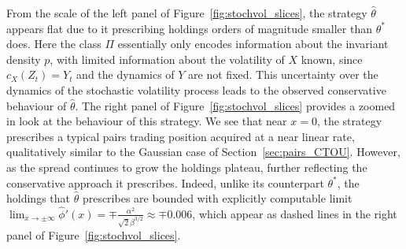 \documentclass{article}
\theoremstyle{plain}
\theoremstyle{definition}
\numberwithin{lem}{section}
\begin{document}
From the scale of the left panel of Figure~\ref{fig:stochvol_slices}, the strategy $\widehat \theta$ appears flat due to it prescribing holdings orders of magnitude smaller than $\theta^*$ does. Here the class $\Pi$ essentially only encodes information about the invariant density $p$, with limited information about the volatility of $X$ known, since $c_X(Z_t) = Y_t$ and the dynamics of $Y$ are not fixed. This uncertainty over the dynamics of the stochastic volatility process leads to the observed conservative behaviour of $\widehat \theta$. The right panel of Figure~\ref{fig:stochvol_slices} provides a zoomed in look at the behaviour of this strategy. We see that near $x = 0$, the strategy prescribes a typical pairs trading position acquired at a near linear rate, qualitatively similar to the Gaussian case of Section~\ref{sec:pairs_CTOU}. However, as the spread continues to grow the holdings plateau, further reflecting the conservative approach it prescribes. Indeed, unlike its counterpart $\theta^*$, the holdings that $\widehat \theta$ prescribes are bounded with explicitly computable limit $\lim_{x \to \pm \infty} \widehat \phi'(x) = \mp \frac{\alpha^2}{\sqrt{2}\beta^{3/2}} \approx \mp 0.006$, which appear as dashed lines in the right panel of Figure~\ref{fig:stochvol_slices}. 
\end{document}
